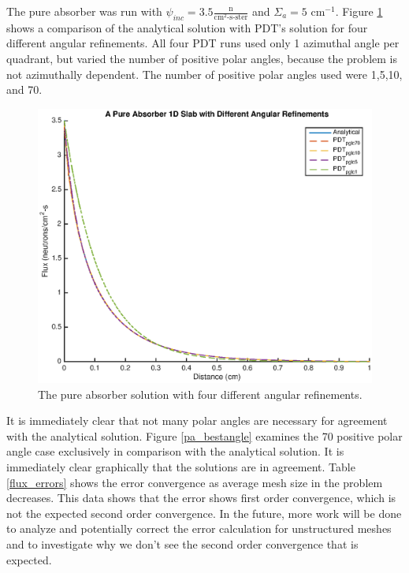 \documentclass{anstrans}
\begin{document}
The pure absorber was run with $\psi_{inc} = 3.5 \frac{\text{n}}{\text{cm}^2\text{-s-ster}}$ and $\Sigma_a = 5 \text{ cm}^{-1}$. Figure \ref{pa_allangles} shows a comparison of the analytical solution with PDT's solution for four different angular refinements. All four PDT runs used only 1 azimuthal angle per quadrant, but varied the number of positive polar angles, because the problem is not azimuthally dependent. The number of positive polar angles used were 1,5,10, and 70. 

\begin{figure}
\centering
\includegraphics[scale = 0.5]{figures/PureAbsorberAllAngles.eps}
\caption{The pure absorber solution with four different angular refinements.}
\label{pa_allangles}
\end{figure}

It is immediately clear that not many polar angles are necessary for agreement with the analytical solution. Figure \ref{pa_bestangle} examines the 70 positive polar angle case exclusively in comparison with the analytical solution. It is immediately clear graphically that the solutions are in agreement. Table \ref{flux_errors} shows the error convergence as average mesh size in the problem decreases. This data shows that the error shows first order convergence, which is not the expected second order convergence. In the future, more work will be done to analyze and potentially correct the error calculation for unstructured meshes and to investigate why we don't see the second order convergence that is expected.
\end{document}
